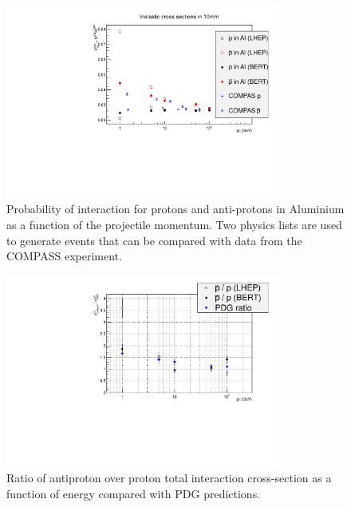 \begin{center}
\begin{figure}[h]
\centering \includegraphics[width=0.8\textwidth]{Detector/figs/validation/General/pCompData_10mm.pdf}
\caption{Probability of interaction for protons and anti-protons in Aluminium as a function of the projectile momentum.
Two physics lists are used to generate events that can be compared with data from the COMPASS experiment.}
\label{fig:AllXsec}
\end{figure}

\begin{figure}[h!]
\centering \includegraphics[width=0.8\textwidth]{Detector/figs/validation/ProtonsRatio_2.pdf}
\caption{Ratio of antiproton over proton total interaction cross-section as a function of energy compared with PDG predictions.}
\label{fig:ProtonsRatios}
\end{figure}


\end{center}
